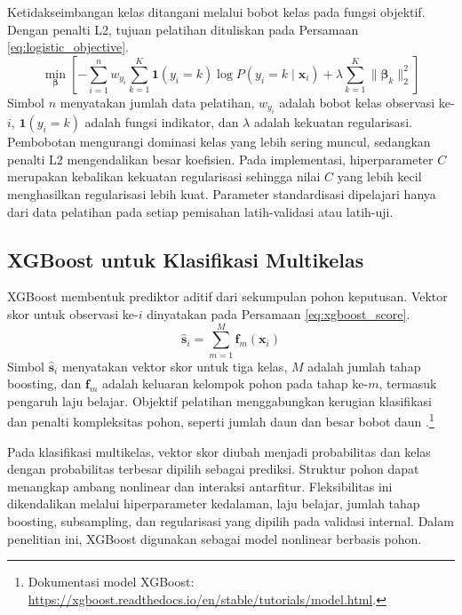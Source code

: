 Ketidakseimbangan kelas ditangani melalui bobot kelas pada fungsi objektif. Dengan penalti L2, tujuan pelatihan dituliskan pada Persamaan \ref{eq:logistic_objective}.
\begin{equation}
\min_{\boldsymbol{\beta}}\left[-\sum_{i=1}^{n}w_{y_i}\sum_{k=1}^{K}\mathbf{1}(y_i=k)\log P(y_i=k\mid\mathbf{x}_i)+\lambda\sum_{k=1}^{K}\lVert\boldsymbol{\beta}_k\rVert_2^2\right]
\label{eq:logistic_objective}
\end{equation}
Simbol $n$ menyatakan jumlah data pelatihan, $w_{y_i}$ adalah bobot kelas observasi ke-$i$, $\mathbf{1}(y_i=k)$ adalah fungsi indikator, dan $\lambda$ adalah kekuatan regularisasi. Pembobotan mengurangi dominasi kelas yang lebih sering muncul, sedangkan penalti L2 mengendalikan besar koefisien. Pada implementasi, hiperparameter $C$ merupakan kebalikan kekuatan regularisasi sehingga nilai $C$ yang lebih kecil menghasilkan regularisasi lebih kuat. Parameter standardisasi dipelajari hanya dari data pelatihan pada setiap pemisahan latih-validasi atau latih-uji.

\subsection{XGBoost untuk Klasifikasi Multikelas}

XGBoost membentuk prediktor aditif dari sekumpulan pohon keputusan. Vektor skor untuk observasi ke-$i$ dinyatakan pada Persamaan \ref{eq:xgboost_score}.
\begin{equation}
\widehat{\mathbf{s}}_i=\sum_{m=1}^{M}\mathbf{f}_m(\mathbf{x}_i)
\label{eq:xgboost_score}
\end{equation}
Simbol $\widehat{\mathbf{s}}_i$ menyatakan vektor skor untuk tiga kelas, $M$ adalah jumlah tahap boosting, dan $\mathbf{f}_m$ adalah keluaran kelompok pohon pada tahap ke-$m$, termasuk pengaruh laju belajar. Objektif pelatihan menggabungkan kerugian klasifikasi dan penalti kompleksitas pohon, seperti jumlah daun dan besar bobot daun \parencite{chen2016xgboost}.\footnote{Dokumentasi model XGBoost: \url{https://xgboost.readthedocs.io/en/stable/tutorials/model.html}.}

Pada klasifikasi multikelas, vektor skor diubah menjadi probabilitas dan kelas dengan probabilitas terbesar dipilih sebagai prediksi. Struktur pohon dapat menangkap ambang nonlinear dan interaksi antarfitur. Fleksibilitas ini dikendalikan melalui hiperparameter kedalaman, laju belajar, jumlah tahap boosting, subsampling, dan regularisasi yang dipilih pada validasi internal. Dalam penelitian ini, XGBoost digunakan sebagai model nonlinear berbasis pohon.

